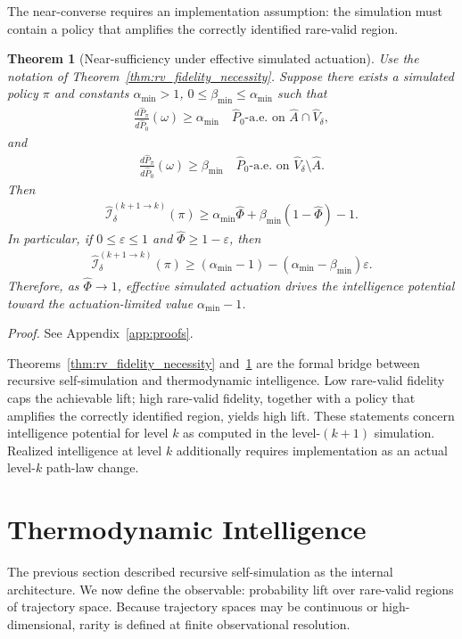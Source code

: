 \documentclass[
  aps,
  prresearch,
  reprint,
  amsmath,
  amssymb,
  superscriptaddress,
  nofootinbib,
  longbibliography
]{revtex4-2}
\def\EQSP{3pt}
\newcommand{\cgather}[2][\EQSP]{\begingroup\setlength\abovedisplayskip{#1}\setlength\belowdisplayskip{#1}\begin{gather} #2 \end{gather}\endgroup\noindent}
\newtheorem{theorem}{Theorem}
\newcommand{\calI}{\mathcal{I}}
\begin{document}
The near-converse requires an implementation assumption: the simulation must contain a policy that amplifies the correctly identified rare-valid region.

\begin{theorem}[Near-sufficiency under effective simulated actuation]
\label{thm:rv_fidelity_sufficiency}
Use the notation of Theorem~\ref{thm:rv_fidelity_necessity}. Suppose there exists a simulated policy \(\pi\) and constants \(\alpha_{\min}>1\), \(0\leq\beta_{\min}\leq\alpha_{\min}\) such that
\cgather{
    \frac{d\widehat P_\pi}{d\widehat P_0}(\omega)
    \geq
    \alpha_{\min}
    \quad
    \widehat P_0\text{-a.e. on }\widehat A\cap\widehat V_\delta,
    \label{eq:alpha_min_on_true_positive}
}
and
\cgather{
    \frac{d\widehat P_\pi}{d\widehat P_0}(\omega)
    \geq
    \beta_{\min}
    \quad
    \widehat P_0\text{-a.e. on }\widehat V_\delta\setminus\widehat A.
    \label{eq:beta_min_on_missed_valid}
}
Then
\cgather{
    \widehat{\calI}_{\delta}^{(k+1\to k)}(\pi)
    \geq
    \alpha_{\min}\widehat\Phi
    +
    \beta_{\min}(1-\widehat\Phi)
    -1.
    \label{eq:rv_sufficiency_bound_general}
}
In particular, if \(0\leq\varepsilon\leq1\) and \(\widehat\Phi\geq1-\varepsilon\), then
\cgather{
    \widehat{\calI}_{\delta}^{(k+1\to k)}(\pi)
    \geq
    (\alpha_{\min}-1)
    -
    (\alpha_{\min}-\beta_{\min})\varepsilon.
    \label{eq:rv_sufficiency_bound_epsilon}
}
Therefore, as \(\widehat\Phi\to1\), effective simulated actuation drives the intelligence potential toward the actuation-limited value \(\alpha_{\min}-1\).
\end{theorem}
\noindent\emph{Proof.} See Appendix~\ref{app:proofs}.

Theorems~\ref{thm:rv_fidelity_necessity} and~\ref{thm:rv_fidelity_sufficiency} are the formal bridge between recursive self-simulation and thermodynamic intelligence. Low rare-valid fidelity caps the achievable lift; high rare-valid fidelity, together with a policy that amplifies the correctly identified region, yields high lift. These statements concern intelligence potential for level \(k\) as computed in the level-\((k+1)\) simulation. Realized intelligence at level \(k\) additionally requires implementation as an actual level-\(k\) path-law change.



\section{Thermodynamic Intelligence}
\label{sec:definition}
The previous section described recursive self-simulation as the internal architecture. We now define the observable: probability lift over rare-valid regions of trajectory space. Because trajectory spaces may be continuous or high-dimensional, rarity is defined at finite observational resolution.
\end{document}
